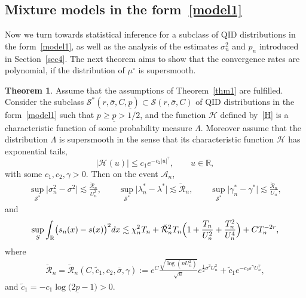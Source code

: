 \documentclass[a4paper,11pt]{article}
\theoremstyle{definition}
\newcommand{\I}{{\rm{1}}}
\newcommand{\R}{{\mathbb{R}}}
\newcommand{\1}{\mathbb{I}}
\newcommand{\A}{\mathscr{A}}
\renewcommand{\S}{S}
\renewcommand{\A}{\mathcal{A}}
\def\R{\mathbb{R}}
\newcommand{\eps}{\varepsilon}
\newcommand{\e}{e}
\newcommand{\F}{\mathcal{F}}
\newtheorem{thm}{Theorem}
\theoremstyle{remark}
\begin{document}
\subsection{Mixture models in the form~\eqref{model1}}
Now we turn towards statistical inference for a subclass of QID distributions in the form~\eqref{model1}, as well as the analysis of the estimates $\sigma^2_n$ and \(p_n\) introduced in Section~\ref{sec4}. The next theorem aims to show that  the convergence rates are polynomial, if the distribution of \(\mu^\circ\) is supersmooth.  

\begin{thm}\label{thm2}
Assume that the assumptions of  Theorem~\ref{thm1} are fulfilled. Consider the subclass \(\mathcal{S}^*(r, \bar{\sigma}, C, \underline{p}) \subset \mathcal{S}(r, \bar{\sigma}, C)\)  of QID distributions in the form~\eqref{model1} such that 
 \(p\geq \underline{p}>1/2\), and the function \(\mathcal{H}\) defined by~\eqref{H} is a characteristic function of some probability measure \(\Lambda\).
 Moreover assume that the distribution \(\Lambda\) is supersmooth in the sense that its characteristic function \(\mathcal{H}\) has exponential tails,%
\begin{equation}\label{ss}
\bigl|\mathcal{H}(u) \bigr|  \leq c_1 e^{-c_2 |u|^\gamma}, \qquad u \in \R,
\end{equation}
with some \(c_1, c_2, \gamma >0.\)
Then on the event $\A_n$,
\begin{align*}
\sup_{\mathcal{S}^*}
\bigl|\sigma^2_n - \sigma^2
\bigr| \lesssim \frac{\breve{\mathcal{R}}_n}{U_n^2},  \qquad
\sup_{\mathcal{S}^*}
\bigl|\lambda_n^* - \lambda^*
\bigr| \lesssim\breve{\mathcal{R}}_n, \qquad
\sup_{\mathcal{S}^*}
\bigl|\gamma^*_n - \gamma^*
\bigr| \lesssim \frac{\breve{\mathcal{R}}_n}{U_n},
\end{align*}
and
\begin{eqnarray*}
\sup_{\S} \int_{\R} \bigl( 
s_n(x) - s(x) 
\bigr)^2 dx \lesssim 
\chi_n^2 T_n + \breve{\mathcal{R}}_n^2  T_n \Bigl( 1+  \frac{T_n}{U_n^2}  + \frac{T_n^2}{U_n^4}\Bigr)
 + C T_n^{-2r},
\end{eqnarray*}
where 
\begin{eqnarray*}
\breve{\mathcal{R}}_n =
\breve{\mathcal{R}}_n (C, \tilde{c}_1, c_2, \overline{\sigma}, \gamma) := 
\e^{C}
\frac{\sqrt{\log(nU_n^2)}}{\sqrt{n}}
e^{\frac{1}{2}\overline{\sigma}^2U_n^2} + \tilde{c}_1   \e^{-c_2 \eps^{\gamma} U_n^{\gamma}},
\end{eqnarray*}
and 
\(\tilde{c}_1 = - c_1  \log\bigl(2 \underline{p}-1 \bigr)>0\).%
\end{thm}
\end{document}
